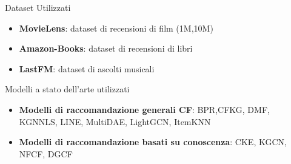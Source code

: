 \begin{frame}{Dataset Utilizzati}
    \begin{itemize}
        \item \textbf{MovieLens}: dataset di recensioni di film (1M,10M)
        \item \textbf{Amazon-Books}: dataset di recensioni di libri
        \item \textbf{LastFM}: dataset di ascolti musicali
    \end{itemize}
\end{frame}

\begin{frame}{Modelli a stato dell'arte utilizzati}
    \begin{itemize}
        \item \textbf{Modelli di raccomandazione generali CF}: BPR,CFKG, DMF, KGNNLS, LINE, MultiDAE, LightGCN, ItemKNN
        \item \textbf{Modelli di raccomandazione basati su conoscenza}: CKE, KGCN, NFCF, DGCF
    \end{itemize}
\end{frame}
